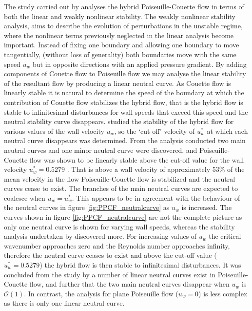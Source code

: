 \documentclass[a4paper, 12pt, twoside, openright]{article}
\numberwithin{equation}{section}
\begin{document}
The study carried out by \cite{CowleyandSmith85} analyses the hybrid Poiseuille-Couette flow in terms of both the linear and weakly nonlinear stability. The weakly nonlinear stability analysis, aims to describe the evolution of perturbations in the unstable regime, where the nonlinear terms previously neglected in the linear analysis become important. Instead of fixing one boundary and allowing one boundary to move tangentially, (without loss of generality) both boundaries move with the same speed $u_w$ but in opposite directions with an applied pressure gradient. By adding components of Couette flow to Poiseuille flow we may analyse the linear stability of the resultant flow by producing a linear neutral curve. As Couette flow is linearly stable it is natural to determine the speed of the boundary at which the contribution of Couette flow stabilizes the hybrid flow, that is the hybrid flow is stable to infinitesimal disturbances for wall speeds that exceed this speed and the neutral stability curve disappears. \cite{CowleyandSmith85} studied the stability of the hybrid flow for various values of the wall velocity $u_w$, so the `cut off' velocity of $u_w^{*}$ at which each neutral curve disappears was determined. From the analysis conducted two main neutral curves and one minor neutral curve were discovered, and Poiseuille-Couette flow was shown to be linearly stable above the cut-off value for the wall velocity $u_w^{*}=0.5279$ \citep{CowleyandSmith85}. That is above a wall velocity of approximately $53\%$ of the mean velocity in the flow Poiseuille-Couette flow is stabilized and the neutral curves cease to exist. The branches of the main neutral curves are expected to coalesce when $u_w=u_w^{*}$. This appears to be in agreement with the behaviour of the neutral curves in figure \ref{fig:PPCF_neutralcurve} as $u_w$ is increased.
The curves shown in figure \ref{fig:PPCF_neutralcurve} are not the complete picture as only one neutral curve is shown for varying wall speeds, whereas the stability analysis undertaken by \cite{CowleyandSmith85} discovered more. For increasing values of $u_w$ the critical wavenumber approaches zero and the Reynolds number approaches infinity, therefore the neutral curve ceases to exist and above the cut-off value ($u_w^{*}=0.5279$) the hybrid flow is then stable to infinitesimal disturbances. It was concluded from the study by \cite{CowleyandSmith85} a number of linear neutral curves exist in Poiseuille-Couette flow, and further that the two main neutral curves disappear when $u_w$ is $\mathcal{O}(1)$. In contrast, the analysis for plane Poiseuille flow ($u_w=0$) is less complex as there is only one linear neutral curve.%
\end{document}
